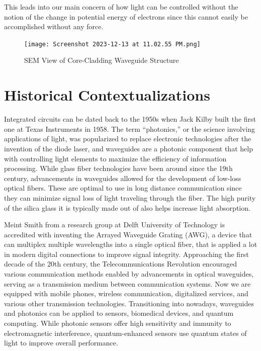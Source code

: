 \documentclass[10pt]{article}
\begin{document}
This leads into our main concern of how light can be controlled without the notion of the change in potential 
energy of electrons since this cannot easily be accomplished without any force.

\begin{figure}[h]
    \centering
    \texttt{[image: Screenshot 2023-12-13 at 11.02.55 PM.png]}
    \caption{SEM View of Core-Cladding Waveguide Structure} 
    \end{figure}


\section{Historical Contextualizations}

Integrated circuits can be dated back to the 1950s when Jack Kilby built the first one at Texas Instruments in 1958. 
The term “photonics,” or the science involving applications of light, was popularized to replace electronic technologies 
after the invention of the diode laser, and waveguides are a photonic component that help with controlling light 
elements to maximize the efficiency of information processing. While glass fiber technologies have been around 
since the 19th century, advancements in waveguides allowed for the development of low-loss optical fibers. 
These are optimal to use in long distance communication since they can minimize signal loss of light traveling 
through the fiber. The high purity of the silica glass it is typically made out of also helps increase light absorption. 

Meint Smith from a research group at Delft University of Technology is accredited with inventing the Arrayed Waveguide Grating (AWG), a device that can multiplex multiple wavelengths into a single optical fiber, that is applied a lot in modern digital connections to improve signal integrity. 
Approaching the first decade of the 20th century, the Telecommunications Revolution encouraged various communication methods enabled by advancements in optical waveguides, serving as a transmission medium between communication systems. 
Now we are equipped with mobile phones, wireless communication, digitalized services, and various other transmission technologies. 
Transitioning into nowadays, waveguides and photonics can be applied to sensors, biomedical devices, and quantum computing. 
While photonic sensors offer high sensitivity and immunity to electromagnetic interference, quantum-enhanced sensors use quantum states of light to improve overall performance.
\end{document}
